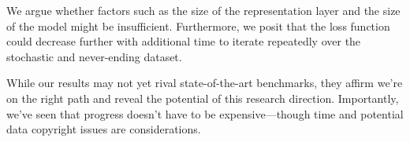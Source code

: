 We argue whether factors such as the size of the representation layer and the size of the model \cite{verydeep} might be insufficient. Furthermore, we posit that the loss function could decrease further with additional time to iterate repeatedly over the stochastic and never-ending dataset.

While our results may not yet rival state-of-the-art benchmarks, they affirm we're on the right path and reveal the potential of this research direction. Importantly, we've seen that progress doesn't have to be expensive—though time and potential data copyright issues are considerations.

\newpage



